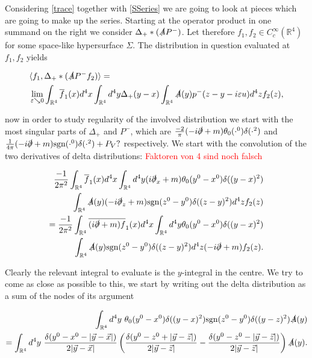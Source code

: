 \documentclass[a4paper,11pt]{article}
\begin{document}
Considering \eqref{trace} together with \eqref{SSeries} we are going to look at pieces which are going to make up the series. Starting at the
 operator product in one summand on the right we consider  \(\Delta_+ *(\slashed{A} P^-)\). Let therefore \(f_1,f_2 \in C_c^\infty(\mathbb{R}^4)\) 
for some space-like hypersurface \(\Sigma\). The distribution in question evaluated at \(f_1, f_2\) yields

\begin{align}
&\langle f_1, \Delta_+ * (\slashed{A} P^- f_2)\rangle =\\
&\lim_{\varepsilon \searrow 0}\int_{\mathbb{R}^4} \overline{f}_1(x) d^4 x \int_{\mathbb{R}^4}d^4y \Delta_+ (y-x)  \int_{\mathbb{R}^4} \slashed{A}(y) p^-(z-y - i \varepsilon u) d^4z f_2(z),
\end{align}

now in order to study regularity of the involved distribution we start with the most singular parts of \(\Delta_+\) and \(P^-\), 
which are \(\frac{-2}{\pi}(-i\slashed{\partial}+m)\theta_0(\cdot^0)  \delta(\cdot^2)\) 
and \(\frac{1}{4 \pi}(-i\slashed{\partial}+m) \text{sgn}(\cdot^0) \delta(\cdot^2) + P_V ?\) respectively. 
We start with the convolution of the two derivatives of delta distributions: \textcolor{red}{Faktoren von 4 sind noch falsch}

\begin{align}
\frac{-1}{2 \pi^2}\int_{\mathbb{R}^4} \overline{f}_1(x) d^4 x
\int_{\mathbb{R}^4}d^4y (i\slashed{\partial}_x+m)\theta_0(y^0-x^0)  \delta((y-x)^2) 
\\ \int_{\mathbb{R}^4} \slashed{A}(y) (-i\slashed{\partial}_z+m) \text{sgn}(z^0-y^0) \delta((z-y)^2) d^4z f_2(z)\\
=\frac{-1}{2 \pi^2}\int_{\mathbb{R}^4} \overline{(i\slashed{\partial}+m)f}_1(x) d^4 x\label{d'*d'evaluation}
\int_{\mathbb{R}^4}d^4y \theta_0(y^0-x^0)  \delta((y-x)^2)\\ \nonumber
\int_{\mathbb{R}^4} \slashed{A}(y)  \text{sgn}(z^0-y^0) \delta((z-y)^2) d^4z (-i\slashed{\partial}+m) f_2(z).
\end{align}

Clearly the relevant integral to evaluate is the \(y\)-integral in the centre. We try to come as close as possible to this, we
start by writing out the delta distribution as a sum of the nodes of its argument

\begin{align}
\int_{\mathbb{R}^4} d^4 y~ \theta_0(y^0-x^0) \delta((y-x)^2) \text{sgn}(z^0-y^0) \delta((y-z)^2) \slashed{A}(y) \\
=\int_{\mathbb{R}^4} d^4 y~
 \frac{\delta(y^0-x^0 - |\vec{y}-\vec{x}|)}{2|\vec{y}-\vec{x}|}
\left( \frac{\delta(y^0-z^0 + |\vec{y}-\vec{z}|)}{2|\vec{y}-\vec{z}|} - \frac{\delta(y^0-z^0 - |\vec{y}-\vec{z}|)}{2|\vec{y}-\vec{z}|} \right)
\slashed{A}(y) .
\end{align}
\end{document}

